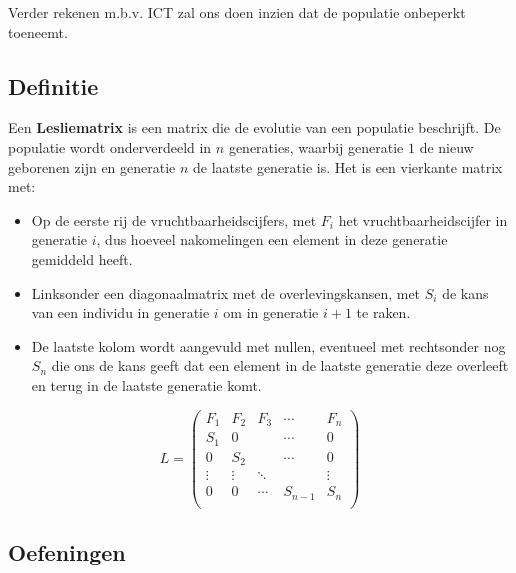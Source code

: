 \documentclass[12pt,twoside]{article}
\begin{document}
Verder rekenen m.b.v. ICT zal ons doen inzien dat de populatie onbeperkt toeneemt.

\subsection{Definitie}

Een {\bf Lesliematrix} is een matrix die de evolutie van een populatie beschrijft. De populatie wordt onderverdeeld in $n$ generaties, waarbij generatie $1$ de nieuw geborenen zijn en generatie $n$ de laatste generatie is. Het is een vierkante matrix met:
\begin{itemize}
\item Op de eerste rij de vruchtbaarheidscijfers, met $F_i$ het vruchtbaarheidscijfer in generatie $i$, dus hoeveel nakomelingen een element in deze generatie gemiddeld heeft.
\item Linksonder een diagonaalmatrix met de overlevingskansen, met $S_i$ de kans van een individu in generatie $i$ om in generatie $i+1$ te raken.
\item De laatste kolom wordt aangevuld met nullen, eventueel met rechtsonder nog $S_n$ die ons de kans geeft dat een element in de laatste generatie deze overleeft en terug in de laatste generatie komt.
\end{itemize}
\[
  L =
  \begin{pmatrix}
    F_1 & F_2 & F_3 & \cdots       & F_n \\
    S_1 & 0   &     & \cdots       & 0   \\
    0   & S_2 &     & \cdots       & 0   \\
    \vdots   & \vdots   & \ddots   &         & \vdots   \\
    0   & 0   & \cdots   & S_{n-1} & S_n \\
  \end{pmatrix}
\]

\needspace{5cm}
\subsection{Oefeningen}
\end{document}
